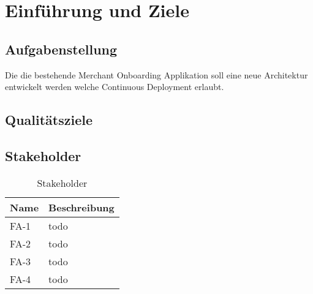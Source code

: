 \chapter{Einführung und Ziele}



\section{Aufgabenstellung}

Die die bestehende Merchant Onboarding Applikation soll eine neue Architektur entwickelt werden welche Continuous Deployment erlaubt.

\section{Qualitätsziele}

\section{Stakeholder}

\begin{table}[H]
	\centering
	\caption{Stakeholder}
	\begin{tabular}{ | p{2cm} | p{14cm} | }
		\toprule
		{\textbf{Name}} & {\textbf{Beschreibung}} \\
		\midrule
		FA-1 & todo \\ \hline
		FA-2 & todo \\ \hline
		FA-3 & todo \\ \hline
		FA-4 & todo \\
		\bottomrule
	\end{tabular}
\end{table}